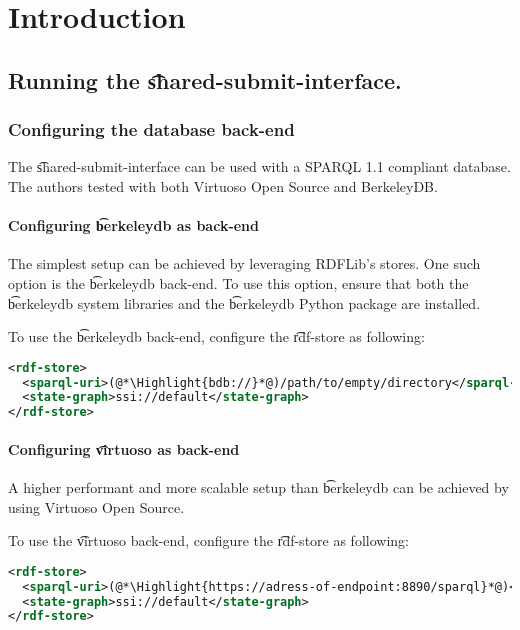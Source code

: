 \chapter{Introduction}

\section{Running the \t{shared-submit-interface}.}

\subsection{Configuring the database back-end}

The \t{shared-submit-interface} can be used with a SPARQL 1.1
compliant database.  The authors tested with both Virtuoso Open Source
and BerkeleyDB.

\subsubsection{Configuring \t{berkeleydb} as back-end}

The simplest setup can be achieved by leveraging RDFLib's
stores.  One such option is the \t{berkeleydb} back-end. To use this option,
ensure that both the \t{berkeleydb} system libraries and the \t{berkeleydb}
Python package are installed.

To use the \t{berkeleydb} back-end, configure the \t{rdf-store} as following:
\begin{lstlisting}[language=xml]
<rdf-store>
  <sparql-uri>(@*\Highlight{bdb://}*@)/path/to/empty/directory</sparql-uri>
  <state-graph>ssi://default</state-graph>
</rdf-store>
\end{lstlisting}

\subsubsection{Configuring \t{virtuoso} as back-end}

A higher performant and more scalable setup than \t{berkeleydb} can be
achieved by using Virtuoso Open Source.

To use the \t{virtuoso} back-end, configure the \t{rdf-store} as following:
\begin{lstlisting}[language=xml]
<rdf-store>
  <sparql-uri>(@*\Highlight{https://adress-of-endpoint:8890/sparql}*@)</sparql-uri>
  <state-graph>ssi://default</state-graph>
</rdf-store>
\end{lstlisting}

